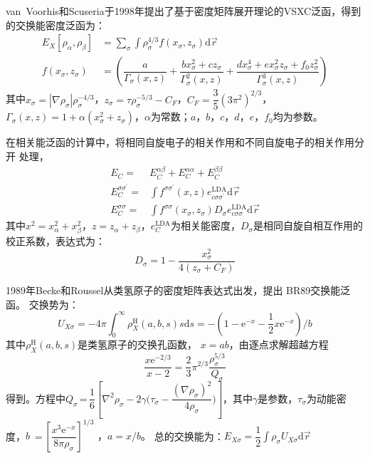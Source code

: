 van~Voorhis和Scuseria于1998年提出了基于密度矩阵展开理论\cite{PRC5-1472_1972,PRC11-1031_1975}的VSXC泛函\cite{JCP109-400_1998}，得到的交换能密度泛函为：
\begin{equation}
  \begin{aligned}
    E_X[\rho_{\alpha},\rho_{\beta}]&=\sum_{\sigma}\int\rho_{\sigma}^{4/3}{f(x_{\sigma},z_{\sigma})
    }\textrm{d}\vec r\\
    f(x_{\sigma},z_{\sigma})&=\left(\dfrac a{\Gamma_{\sigma}(x,z)}+\dfrac{bx_{\sigma}^2+cz_{\sigma}}{\Gamma_{\sigma}^2(x,z)}+\dfrac{dx_{\sigma}^4+ex_{\sigma}^2z_{\sigma}+f_0z_{\sigma}^2}{\Gamma_{\sigma}^3(x,z)}\right) 
  \end{aligned}
  \label{ed:def-22}
\end{equation}
其中$x_{\sigma}=|\nabla\rho_{\sigma}|\rho_{\sigma}^{-4/3}$，$z_{\sigma}=\tau\rho_{\sigma}^{-5/3}-C_F$，$C_F=\dfrac35(3\pi^2)^{2/3}$，$\Gamma_{\sigma}(x,z)=1+\alpha(x_{\sigma}^2+z_{\sigma})$，\linebreak $\alpha$为常数；$a$，$b$，$c$，$d$，$e$，$f_0$均为参数。

{在}相关能泛函的计算中，将相同自旋电子的相关作用和不同自旋{电子}的相关作用分开%
{处理}\cite{TCA49-143_1978}，%
\begin{equation}
  \begin{aligned}
    E_C=&E_C^{\alpha\beta}+E_C^{\alpha\alpha}+E_C^{\beta\beta}\\
    E_C^{\sigma\sigma^{\prime}}=&\int f^{\sigma\sigma^{\prime}}(x,z)e_{c\sigma\sigma^{\prime}}^{\mathrm{LDA}}\textrm{d}\vec r\\
    E_C^{\sigma\sigma}=&\int f^{\sigma\sigma}(x_{\sigma},z_{\sigma})
    D_{\sigma}e_{c\sigma\sigma}^{\mathrm{LDA}}\textrm{d}\vec r
  \end{aligned}
  \label{eq:dft-23}
\end{equation}
其中$x^2=x_{\alpha}^2+x_{\beta}^2$，$z=z_{\alpha}+z_{\beta}$，{$e_C^{\mathrm{LDA}}$为相关能密度，}$D_{\sigma}$是相同自旋自相互作用的校正系数，表达式为：
$$D_{\sigma}=1-\dfrac{x_{\sigma}^2}{4(z_{\sigma}+C_F)}$$

1989年Becke和Roussel从类氢原子的密度矩阵表达式出发，提出%
BR89交换能泛函\cite{PRA39-3761_1989}。
交换势为：
$$U_{X\sigma}=-4\pi\int_0^{\infty}\rho_X^{\mathrm{H}}(a,b,s)s\textrm{d}s=-\left(1-\textrm{e}^{-x}-\frac12x\textrm{e}^{-x}\right)/b$$
其中$\rho_X^{\mathrm{H}}(a,b,s)$是类氢原子的交换孔函数，%
{$x=ab$}，由{逐点求解}超越方程
$$\dfrac{x\textrm{e}^{-2/3}}{x-2}=\dfrac23\pi^{2/3}\dfrac{\rho_{\sigma}^{5/3}}{Q_{\sigma}}$$
得到。方程中$Q_{\sigma}$\,=\,$\dfrac16\left[\nabla^2\rho_{\sigma}-2\gamma\bigl(\tau_{\sigma}-\dfrac{(\nabla\rho_{\sigma})^2}{4\rho_{\sigma}}\bigr)\right]$，其中$\gamma$是参数，$\tau_{\sigma}$为动能密度{，}\linebreak $b$%
\,=\,$\left[\dfrac{x^3\textrm{e}^{-x}}{8\pi\rho_{\sigma}}\right]^{1/3}$%
{，$a=x/b$。}%
总的交换能为：$E_{X\sigma}=\dfrac12\displaystyle\int\rho_{\sigma}U_{X\sigma}\textrm{d}\vec r$

